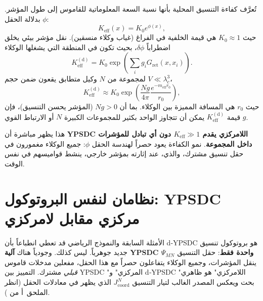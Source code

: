 \documentclass[11pt,a4paper]{article}
\newcommand{\Keff}{K_{\mathrm{eff}}}
\begin{document}
	تُعرَّف كفاءة التنسيق المحلية بأنها نسبة السعة المعلوماتية للقاموس إلى طول المؤشر. بدلالة الحقل \(\phi\):
	\begin{equation}
		\Keff(x) = K_0 e^{\phi(x)},
		\label{eq:Keff-field}
	\end{equation}
	حيث \(K_0 \approx 1\) هي قيمة الخلفية في الفراغ (غياب وكلاء منسقين). نقل مؤشر بيئي يخلق اضطراباً \(\delta\phi\)، بحيث تكون في المنطقة التي يشغلها الوكلاء
	\begin{equation}
		\Keff^{\mathrm{(d)}} = K_0 \exp\!\left( \sum_i g_i G_{\mathrm{ret}}(x, x_i) \right).
	\end{equation}
	لمجموعة من \(N\) وكيل متطابق يقعون ضمن حجم \(V \ll \lambda_c^3\)،
	\begin{equation}
		\Keff^{\mathrm{(d)}} \approx K_0 \exp\!\left( \frac{N g}{4\pi} \frac{e^{-m_{\mathrm{eff}} r_0}}{r_0} \right),
	\end{equation}
	حيث \(r_0\) هي المسافة المميزة بين الوكلاء. بما أن \(N g > 0\) (المؤشر يحسن التنسيق)، فإن قيمة \(\Keff^{\mathrm{(d)}}\) يمكن أن تتجاوز الواحد بكثير للمجموعات الكبيرة \(N\) أو الارتباط القوي \(g\).
	
	هذا يظهر مباشرة أن \textbf{YPSDC اللامركزي يقدم \(K_{\mathrm{eff}} \gg 1\) دون أي تبادل للمؤشرات داخل المجموعة}. نمو الكفاءة يعود حصراً لهندسة الحقل \(\phi\): جميع الوكلاء مغمورون في حقل تنسيق مشترك، والذي، عند إثارته بمؤشر خارجي، ينشط قواميسهم في نفس الوقت.
	
	\section{نظامان لنفس البروتوكول: YPSDC مركزي مقابل لامركزي}
	\label{sec:two-regimes}
	
	الأمثلة السابقة والنموذج الرياضي قد تعطي انطباعاً بأن d‑YPSDC هو بروتوكول تنسيق جديد جوهرياً. ليس كذلك. وجودياً هناك \textbf{آلية YPSDC واحدة فقط}: حقل التنسيق \(\Psi_{MN}\) ينقل المؤشرات، وجميع الوكلاء يتفاعلون حصراً مع هذا الحقل، مفعلين مدخلات قاموس \emph{قبلي} مشترك. التمييز بين YPSDC "المركزي" و d‑YPSDC "اللامركزي" هو ظاهري بحت ويعكس المصدر الغالب لتيار التنسيق \(J^{N}_{\mathrm{coord}}\) الذي يظهر في معادلات الحقل (انظر الملحق~أ من \cite{YUCT}).
	
\end{document}
